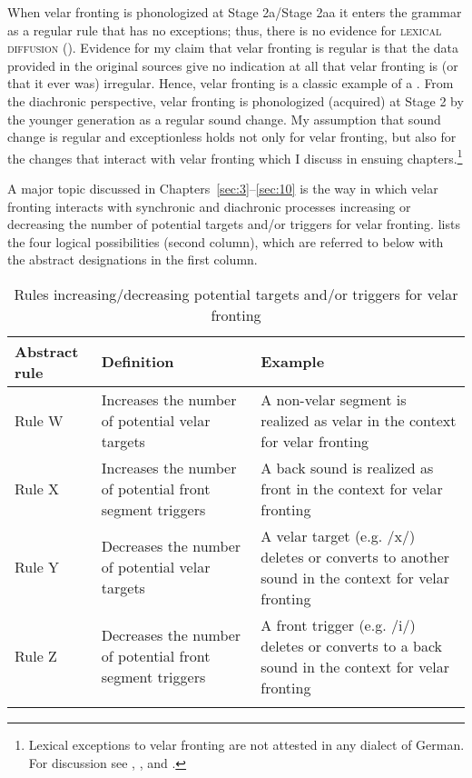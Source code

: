 \begin{xlist}
\begin{xlist}
When velar fronting is phonologized at Stage 2a\slash Stage 2aa it enters the grammar as a regular rule that has no exceptions; thus, there is no evidence for \textsc{lexical diffusion} (\citealt{ChenWang1975,Kiparsky1995,Phillips2006}).
Evidence for my claim that velar fronting is regular is that the data provided in the original sources give no indication at all that velar fronting is (or that it ever was) irregular.  Hence, velar fronting is a classic example of a .
From the diachronic perspective, velar fronting is phonologized (acquired) at Stage 2 by the younger generation as a regular sound change.
My assumption that sound change is regular and exceptionless holds not only for velar fronting, but also for the changes that interact with velar fronting which I discuss in ensuing chapters.\footnote{Lexical
 exceptions to velar fronting are not attested in any dialect of German. For discussion see , , and .
}



A major topic discussed in Chapters~\ref{sec:3}--\ref{sec:10} is the way in which velar fronting interacts with synchronic and diachronic processes increasing or decreasing the number of potential targets and/or triggers for velar fronting.  lists the four logical possibilities (second column), which are referred to below with the abstract designations in the first column.

\begin{table}
\caption{Rules increasing/decreasing potential targets and/or triggers for velar fronting\label{tab:2.1}
\label{tab:2.wxyz}}
\small
\begin{tabularx}{\textwidth}{lQQ}
\lsptoprule
Abstract rule & Definition & Example\\
\midrule
Rule W & Increases the number of potential velar targets & A non-velar segment is realized as velar in the context for velar fronting\\
Rule X & Increases the number of potential front segment triggers & A back sound is realized as front in the context for velar fronting\\
Rule Y & Decreases the number of potential velar targets & A velar target (e.g. /x/) deletes or converts to another sound in the context for velar fronting\\
Rule Z & Decreases the number of potential front segment triggers & A front trigger (e.g. /i/) deletes or converts to a back sound in the context for velar fronting\\
\lspbottomrule
\end{tabularx}
\end{table}


\end{xlist}
\end{xlist}
